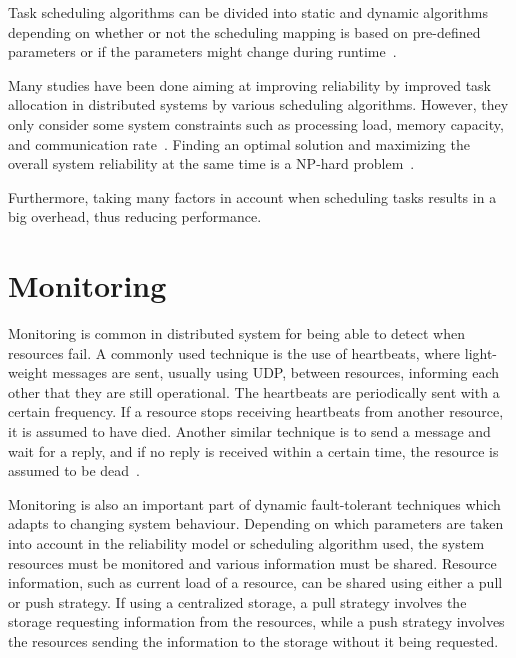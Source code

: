 \documentclass{cslthse-msc}
\begin{document}
Task scheduling algorithms can be divided into static and dynamic algorithms depending on whether or not the scheduling mapping is based on pre-defined parameters or if the parameters might change during runtime~\cite{schedReplicas}.

Many studies have been done aiming at improving reliability by improved task allocation in distributed systems by various scheduling algorithms. However, they only consider some system constraints such as processing load, memory capacity, and communication rate~\cite{optTaskAllocationForMaxRel}. Finding an optimal solution and maximizing the overall system reliability at the same time is a NP-hard problem~\cite{optTaskAllocationForMaxRel, taskAllocationSwarm, schedulingSurvey}.

Furthermore, taking many factors in account when scheduling tasks results in a big overhead, thus reducing performance. 


\section{Monitoring} \label{sec:background_monitoring}
Monitoring is common in distributed system for being able to detect when resources fail. A commonly used technique is the use of heartbeats, where light-weight messages are sent, usually using UDP, between resources, informing each other that they are still operational. The heartbeats are periodically sent with a certain frequency. If a resource stops receiving heartbeats from another resource, it is assumed to have died. Another similar technique is to send a message and wait for a reply, and if no reply is received within a certain time, the resource is assumed to be dead~\cite{probabilistic_recovery}.

Monitoring is also an important part of dynamic fault-tolerant techniques which adapts to changing system behaviour. Depending on which parameters are taken into account in the reliability model or scheduling algorithm used, the system resources must be monitored and various information must be shared. Resource information, such as current load of a resource, can be shared using either a pull or push strategy. If using a centralized storage, a pull strategy involves the storage requesting information from the resources, while a push strategy involves the resources sending the information to the storage without it being requested.
\end{document}
